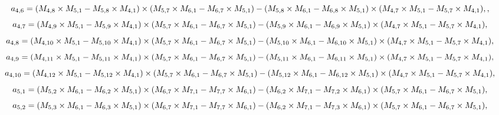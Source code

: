 \documentclass[10pt]{asme2ej}
\begin{document}
\begin{landscape}
\begin{equation}
    a_{4,6} = (M_{4,8}\times M_{5,1}-M_{5,8}\times M_{4,1})\times (M_{5,7}\times M_{6,1}-M_{6,7}\times M_{5,1})\\-(M_{5,8}\times M_{6,1}-M_{6,8}\times M_{5,1})\times (M_{4,7}\times M_{5,1}-M_{5,7}\times M_{4,1}),,
\end{equation}
\begin{equation}
    a_{4,7} = (M_{4,9}\times M_{5,1}-M_{5,9}\times M_{4,1})\times (M_{5,7}\times M_{6,1}-M_{6,7}\times M_{5,1})\\-(M_{5,9}\times M_{6,1}-M_{6,9}\times M_{5,1})\times (M_{4,7}\times M_{5,1}-M_{5,7}\times M_{4,1}),
\end{equation}
\begin{equation}
    a_{4,8} = (M_{4,10}\times M_{5,1}-M_{5,10}\times M_{4,1})\times (M_{5,7}\times M_{6,1}-M_{6,7}\times M_{5,1})\\-(M_{5,10}\times M_{6,1}-M_{6,10}\times M_{5,1})\times (M_{4,7}\times M_{5,1}-M_{5,7}\times M_{4,1}),
\end{equation}
\begin{equation}
    a_{4,9} = (M_{4,11}\times M_{5,1}-M_{5,11}\times M_{4,1})\times (M_{5,7}\times M_{6,1}-M_{6,7}\times M_{5,1})\\-(M_{5,11}\times M_{6,1}-M_{6,11}\times M_{5,1})\times (M_{4,7}\times M_{5,1}-M_{5,7}\times M_{4,1}),
\end{equation}
\begin{equation}
    a_{4,10} = (M_{4,12}\times M_{5,1}-M_{5,12}\times M_{4,1})\times (M_{5,7}\times M_{6,1}-M_{6,7}\times M_{5,1})\\-(M_{5,12}\times M_{6,1}-M_{6,12}\times M_{5,1})\times (M_{4,7}\times M_{5,1}-M_{5,7}\times M_{4,1}),
\end{equation}
\begin{equation}
    a_{5,1} = (M_{5,2}\times M_{6,1}-M_{6,2}\times M_{5,1})\times (M_{6,7}\times M_{7,1}-M_{7,7}\times M_{6,1})\\-(M_{6,2}\times M_{7,1}-M_{7,2}\times M_{6,1})\times (M_{5,7}\times M_{6,1}-M_{6,7}\times M_{5,1}),
\end{equation}
\begin{equation}
    a_{5,2} = (M_{5,3}\times M_{6,1}-M_{6,3}\times M_{5,1})\times (M_{6,7}\times M_{7,1}-M_{7,7}\times M_{6,1})\\-(M_{6,2}\times M_{7,1}-M_{7,3}\times M_{6,1})\times (M_{5,7}\times M_{6,1}-M_{6,7}\times M_{5,1}),
\end{equation}
\begin{equation}

\end{equation}
\end{landscape}
\end{document}
